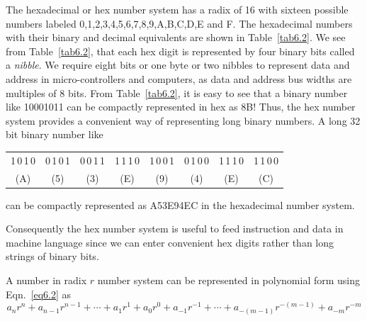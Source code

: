 The hexadecimal or hex number system has a radix of 16 with sixteen possible numbers labeled 0,1,2,3,4,5,6,7,8,9,A,B,C,D,E and F. The hexadecimal numbers with their binary and decimal equivalents are shown in Table~\ref{tab6.2}. We see from Table~\ref{tab6.2}, that each hex digit is represented by four binary bits called a {\em nibble}. We require eight bits or one byte or two nibbles to represent data and address in micro-controllers and computers, as data and address bus widths are multiples of 8 bits. From Table~\ref{tab6.2}, it is easy to see that a binary number like 10001011 can be compactly represented in hex as 8B! Thus, the hex number system provides a convenient way of representing long binary numbers. A long 32 bit binary number like
\begin{center}
\begin{tabular}{cccccccc}
1\,0\,1\,0 & 0\,1\,0\,1 & 0\,0\,1\,1 & 1\,1\,1\,0 & 1\,0\,0\,1 & 0\,1\,0\,0 & 1\,1\,1\,0 & 1\,1\,0\,0\\[3pt]
(A) & (5) & (3) & (E) & (9) & (4) & (E) & (C)
\end{tabular}
\end{center}
can be compactly represented as A53E94EC in the hexadecimal number system.

Consequently the hex number system is useful to feed instruction and data in machine language since we can enter convenient hex digits rather than long strings of binary bits.

A number in radix $r$ number system can be represented in polynomial form using Eqn.~\eqref{eq6.2} as
$$
a_{n}r^{n}+a_{n-1}r^{n-1}+\cdots+a_{1}r^{1}+a_{0}r^{0}+a_{-1}r^{-1}+\cdots+a_{-(m-1)}r^{-(m-1)}+a_{-m}r^{-m}
$$

